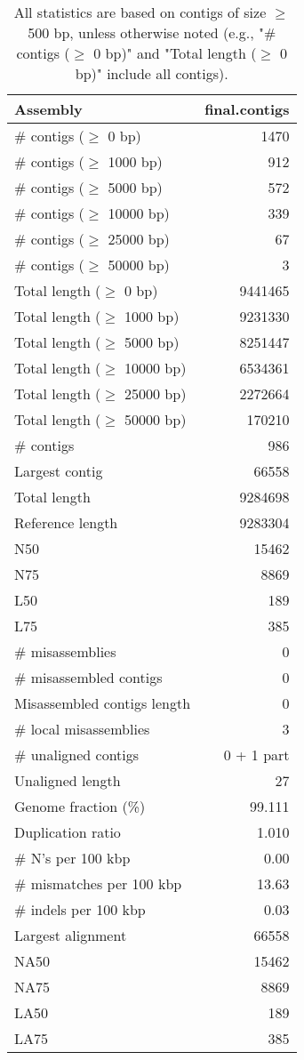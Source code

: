 \documentclass[12pt,a4paper]{article}
\begin{document}
\begin{table}[ht]
\begin{center}
\caption{All statistics are based on contigs of size $\geq$ 500 bp, unless otherwise noted (e.g., "\# contigs ($\geq$ 0 bp)" and "Total length ($\geq$ 0 bp)" include all contigs).}
\begin{tabular}{|l*{1}{|r}|}
\hline
Assembly & final.contigs \\ \hline
\# contigs ($\geq$ 0 bp) & 1470 \\ \hline
\# contigs ($\geq$ 1000 bp) & 912 \\ \hline
\# contigs ($\geq$ 5000 bp) & 572 \\ \hline
\# contigs ($\geq$ 10000 bp) & 339 \\ \hline
\# contigs ($\geq$ 25000 bp) & 67 \\ \hline
\# contigs ($\geq$ 50000 bp) & 3 \\ \hline
Total length ($\geq$ 0 bp) & 9441465 \\ \hline
Total length ($\geq$ 1000 bp) & 9231330 \\ \hline
Total length ($\geq$ 5000 bp) & 8251447 \\ \hline
Total length ($\geq$ 10000 bp) & 6534361 \\ \hline
Total length ($\geq$ 25000 bp) & 2272664 \\ \hline
Total length ($\geq$ 50000 bp) & 170210 \\ \hline
\# contigs & 986 \\ \hline
Largest contig & 66558 \\ \hline
Total length & 9284698 \\ \hline
Reference length & 9283304 \\ \hline
N50 & 15462 \\ \hline
N75 & 8869 \\ \hline
L50 & 189 \\ \hline
L75 & 385 \\ \hline
\# misassemblies & 0 \\ \hline
\# misassembled contigs & 0 \\ \hline
Misassembled contigs length & 0 \\ \hline
\# local misassemblies & 3 \\ \hline
\# unaligned contigs & 0 + 1 part \\ \hline
Unaligned length & 27 \\ \hline
Genome fraction (\%) & 99.111 \\ \hline
Duplication ratio & 1.010 \\ \hline
\# N's per 100 kbp & 0.00 \\ \hline
\# mismatches per 100 kbp & 13.63 \\ \hline
\# indels per 100 kbp & 0.03 \\ \hline
Largest alignment & 66558 \\ \hline
NA50 & 15462 \\ \hline
NA75 & 8869 \\ \hline
LA50 & 189 \\ \hline
LA75 & 385 \\ \hline
\end{tabular}
\end{center}
\end{table}
\end{document}
